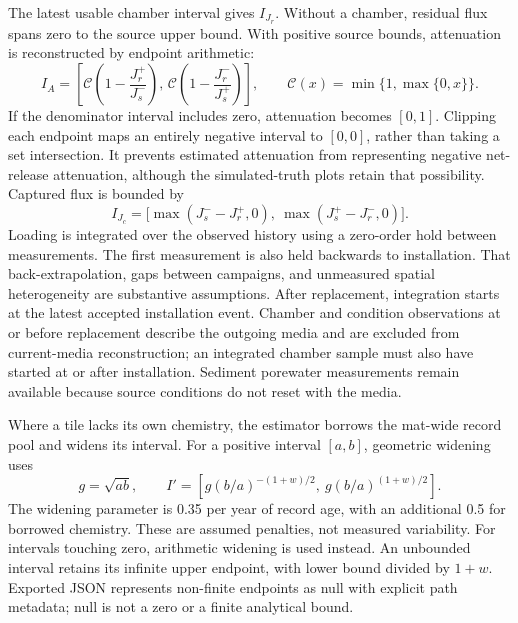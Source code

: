 The latest usable chamber interval gives $I_{J_r}$. Without a chamber, residual flux spans zero to the source upper bound. With positive source bounds, attenuation is reconstructed by endpoint arithmetic:
\begin{equation}
I_A=\left[\mathcal{C}\!\left(1-\frac{J_r^+}{J_s^-}\right),\,
\mathcal{C}\!\left(1-\frac{J_r^-}{J_s^+}\right)\right],\qquad
\mathcal{C}(x)=\min\{1,\max\{0,x\}\}.
\end{equation}
If the denominator interval includes zero, attenuation becomes $[0,1]$. Clipping each endpoint maps an entirely negative interval to $[0,0]$, rather than taking a set intersection. It prevents estimated attenuation from representing negative net-release attenuation, although the simulated-truth plots retain that possibility. Captured flux is bounded by
\begin{equation}
I_{J_c}=\big[\max(J_s^- -J_r^+,0),\ \max(J_s^+-J_r^-,0)\big].
\end{equation}
Loading is integrated over the observed history using a zero-order hold between measurements. The first measurement is also held backwards to installation. That back-extrapolation, gaps between campaigns, and unmeasured spatial heterogeneity are substantive assumptions. After replacement, integration starts at the latest accepted installation event. Chamber and condition observations at or before replacement describe the outgoing media and are excluded from current-media reconstruction; an integrated chamber sample must also have started at or after installation. Sediment porewater measurements remain available because source conditions do not reset with the media.

Where a tile lacks its own chemistry, the estimator borrows the mat-wide record pool and widens its interval. For a positive interval $[a,b]$, geometric widening uses
\begin{equation}
g=\sqrt{ab},\qquad
I'=\left[g(b/a)^{-(1+w)/2},\ g(b/a)^{(1+w)/2}\right].
\end{equation}
The widening parameter is 0.35 per year of record age, with an additional 0.5 for borrowed chemistry. These are assumed penalties, not measured variability. For intervals touching zero, arithmetic widening is used instead. An unbounded interval retains its infinite upper endpoint, with lower bound divided by $1+w$. Exported JSON represents non-finite endpoints as null with explicit path metadata; null is not a zero or a finite analytical bound.

